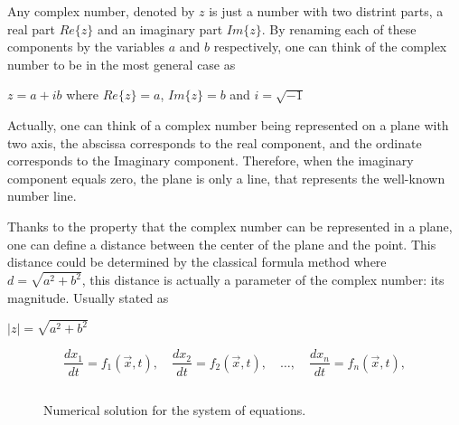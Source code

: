 \documentclass{article}
\begin{document}
Any complex number, denoted by $z$ is just a number with two distrint parts, a real part $Re\{z\}$ and an imaginary part $Im\{z\}$. By renaming each of these components by the variables $a$ and $b$ respectively, one can think of the complex number to be in the most general case as

$z=a+ib$ where $Re\{z\} = a$, $Im\{z\} = b$ and $i=\sqrt{-1}$

Actually, one can think of a complex number being represented on a plane with two axis, the abscissa corresponds to the real component, and the ordinate corresponds to the Imaginary component. Therefore, when the imaginary component equals zero, the plane is only a line, that represents the well-known number line. 

Thanks to the property that the complex number can be represented in a plane, one can define a distance between the center of the plane and the point. This distance could be determined by the classical formula method where 
$d = \sqrt{a^2 + b^2}$, this distance is actually a parameter of the complex number: its magnitude. Usually stated as 

$|z| = \sqrt{a^2 + b^2}$


\begin{equation}
    \frac{dx_1}{dt}=f_1(\vec{x},t),\quad \frac{dx_2}{dt}=f_2(\vec{x},t),\quad \dots, \quad \frac{dx_n}{dt}=f_n(\vec{x},t),
\end{equation} 

\begin{lstlisting}[language=Python, frame=single] 


\end{lstlisting}


\begin{figure}[h]
    \caption{Numerical solution for the system of equations.}
    \label{fig:sol}
\end{figure}



\printbibliography[title = {References}]
\end{document}
